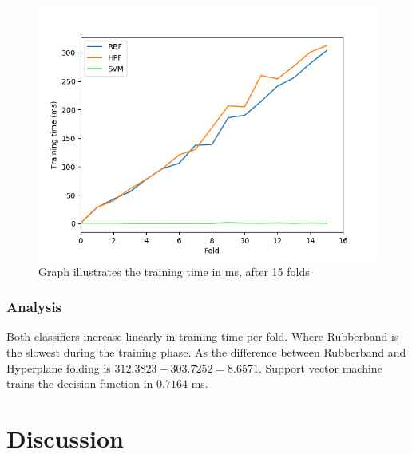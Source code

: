 \documentclass[a4paper,twoside]{bth}
\begin{document}
\begin{figure}[!htb]
\centering
\includegraphics[scale=0.7]{images/result-hep/hep_k_15/Trainingtime(ms).png}
   \caption{Graph illustrates the training time in ms, after 15 folds}
   \label{fig:hep-fit}
\end{figure}
\FloatBarrier
\subsection{Analysis}
Both classifiers increase linearly in training time per fold. Where Rubberband is the slowest during the training phase. As the difference between Rubberband and Hyperplane folding is $312.3823 - 303.7252 = 8.6571$. Support vector machine trains the decision function in $0.7164$ ms.



\chapter{Discussion}
\end{document}
